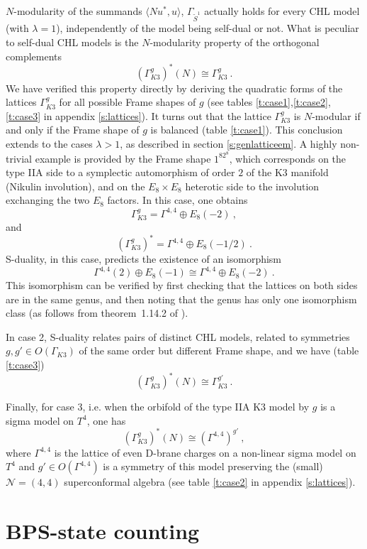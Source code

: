 \documentclass[a4paper,11pt]{article}
\newcommand{\N}{\mathcal{N}}
\numberwithin{equation}{section}
\def\be{\begin{equation}}
\def\ee{\end{equation}}
\begin{document}
$N$-modularity of the summands $\langle N u^*, u\rangle$, $ \Gamma_{\tilde S^1}$ actually holds for every CHL model (with $\lambda=1$), independently of the model being self-dual or not. What is peculiar to self-dual CHL models is the $N$-modularity property of the orthogonal complements
\be (\Gamma_{K3}^g)^*(N)\cong \Gamma_{K3}^g\ .
\ee We have verified this property directly by deriving the quadratic forms of the lattices $\Gamma_{K3}^g$ for all possible Frame shapes of $g$ (see tables \ref{t:case1},\ref{t:case2},\ref{t:case3} in appendix \ref{s:lattices}). It turns out that the lattice $\Gamma_{K3}^g$ is $N$-modular if and only if the Frame shape of $g$ is balanced (table \ref{t:case1}). This conclusion extends to the cases $\lambda>1$, as described in section \ref{s:genlatticeem}. A highly non-trivial example is provided by the Frame shape $1^82^8$, which corresponds on the type IIA side to a symplectic automorphism of order $2$ of the K3 manifold (Nikulin involution), and on the $E_8\times E_8$ heterotic side to the involution exchanging the two $E_8$ factors. In this case, one obtains
\be \Gamma_{K3}^g= \Gamma^{4,4}\oplus E_8(-2)\ ,
\ee  and 
\be (\Gamma_{K3}^g)^*= \Gamma^{4,4}\oplus E_8(-1/2)\ .
\ee S-duality, in this case, predicts the existence of an isomorphism
\be \Gamma^{4,4}(2)\oplus E_8(-1)\cong \Gamma^{4,4}\oplus E_8(-2)\ .
\ee This isomorphism can be verified by first checking that the lattices on both sides are in the same genus, and then noting that the genus has only one isomorphism class (as follows from theorem~1.14.2 of \cite{Nikulin}).

In case 2, S-duality relates pairs of distinct CHL models, related to symmetries $g, g'\in O(\Gamma_{K3})$ of the same order but different Frame shape, and we have (table \ref{t:case3})
\be (\Gamma_{K3}^g)^*(N)\cong \Gamma_{K3}^{g'}\ .
\ee 


Finally,  for case 3, i.e. when the orbifold of the type IIA K3 model by $g$ is a sigma model on $T^4$, one has
\be (\Gamma_{K3}^g)^*(N)\cong (\Gamma^{4,4})^{g'}\ ,
\ee where $\Gamma^{4,4}$ is the lattice of even D-brane charges on a non-linear sigma model on $T^4$ and $g'\in O(\Gamma^{4,4})$ is a symmetry of this model preserving the (small) $\N=(4,4)$ superconformal algebra \cite{Volpato:2014zla} (see table \ref{t:case2} in appendix \ref{s:lattices}).




\section{BPS-state counting}
\label{sec:BPScount}
\end{document}
